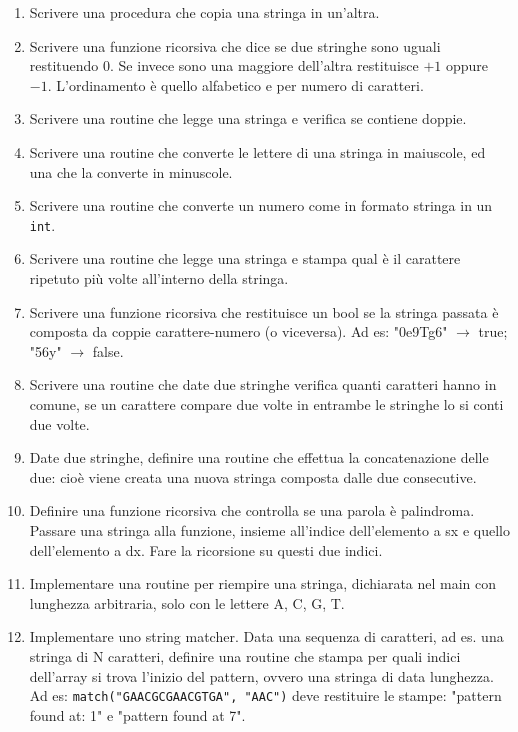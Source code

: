 \documentclass{article}
\begin{document}
\begin{enumerate}
\item Scrivere una procedura che copia una stringa in un'altra.

\item Scrivere una funzione ricorsiva che dice se due stringhe sono uguali restituendo $0$. Se invece sono una maggiore dell'altra restituisce $+1$ oppure $-1$. L'ordinamento è quello alfabetico e per numero di caratteri.

\item Scrivere una routine che legge una stringa e verifica se contiene doppie.

\item Scrivere una routine che converte le lettere di una stringa in maiuscole, ed una che la converte in minuscole.

\item Scrivere una routine che converte un numero come in formato stringa in un \texttt{int}.

\item Scrivere una routine che legge una stringa e stampa qual è il carattere ripetuto più volte all’interno della stringa.

\item Scrivere una funzione ricorsiva che restituisce un bool se la stringa passata è composta da coppie carattere-numero (o viceversa). Ad es: "0e9Tg6" $\rightarrow$ true; "56y" $\rightarrow$ false.

\item Scrivere una routine che date due stringhe verifica quanti caratteri hanno in comune, se un carattere compare due volte in entrambe le stringhe lo si conti due volte.

\item Date due stringhe, definire una routine che effettua la concatenazione delle due: cioè viene creata una nuova stringa composta dalle due consecutive.

\item Definire una funzione ricorsiva che controlla se una parola è palindroma. Passare una stringa alla funzione, insieme all'indice dell'elemento a sx e quello dell'elemento a dx. Fare la ricorsione su questi due indici.

\item Implementare una routine per riempire una stringa, dichiarata nel main con lunghezza arbitraria, solo con le lettere A, C, G, T.

\item Implementare uno string matcher. Data una sequenza di caratteri, ad es. una stringa di N caratteri, definire una routine che stampa per quali indici dell'array si trova l'inizio del pattern, ovvero una stringa di data lunghezza. Ad es: \texttt{match("GAACGCGAACGTGA", "AAC")} deve restituire le stampe: "pattern found at: 1" e "pattern found at 7".


\end{enumerate}
\end{document}
